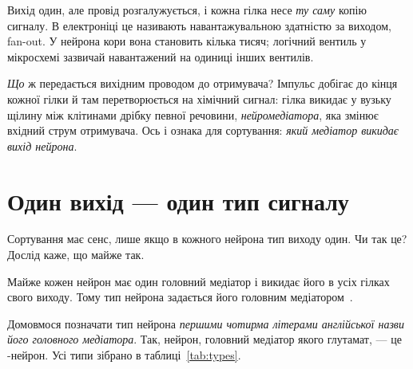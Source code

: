 Вихід один, але провід розгалужується, і кожна гілка несе \emph{ту саму} копію сигналу. В електроніці це називають навантажувальною здатністю за виходом, fan-out. У нейрона кори вона становить кілька тисяч; логічний вентиль у мікросхемі зазвичай навантажений на одиниці інших вентилів.

\emph{Що} ж передається вихідним проводом до отримувача? Імпульс добігає до кінця кожної гілки й там перетворюється на хімічний сигнал: гілка викидає у вузьку щілину між клітинами дрібку певної речовини, \emph{нейромедіатора}, яка змінює вхідний струм отримувача. Ось і ознака для сортування: \emph{який медіатор викидає вихід нейрона}.

\section{Один вихід --- один тип сигналу}

Сортування має сенс, лише якщо в кожного нейрона тип виходу один. Чи так це? Дослід каже, що майже так.

\begin{keyblock}
\begin{proposition}
\label{prop:dale}
Майже кожен нейрон має один головний медіатор і викидає його в усіх гілках свого виходу. Тому тип нейрона задається його головним медіатором~\cite{Strata1999}.
\end{proposition}
\end{keyblock}

Домовмося позначати тип нейрона \emph{першими чотирма літерами англійської назви його головного медіатора}. Так, нейрон, головний медіатор якого глутамат, --- це -нейрон. Усі типи зібрано в таблиці~\ref{tab:types}.

